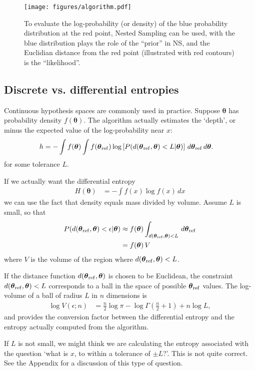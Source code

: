\documentclass[entropy,article,accept,oneauthor,pdftex,10pt,a4paper]{mdpi}
\newcommand{\x}{\boldsymbol{\theta}}
\newcommand{\xref}{\x_{\rm ref}}
\begin{document}
\begin{figure}[!ht]
\centering
\texttt{[image: figures/algorithm.pdf]}
\caption{To evaluate the log-probability (or density) of the blue
probability distribution at the red point, Nested Sampling can be used,
with the blue distribution plays the role of the ``prior'' in NS, and the
Euclidian distance from the red point (illustrated with red contours)
is the ``likelihood''.\label{fig:algorithm}}
\end{figure}

\subsection{Discrete vs. differential entropies}

Continuous hypothesis spaces are commonly used in practice. Suppose
$\x$ has probability density $f(\x)$. The algorithm actually estimates
the `depth', or minus the expected value of the log-probability near $x$:
\begin{align}
h &= -\int f(\x) \int f(\xref)
            \log \left[ P(d(\xref, \x) < L | \x) \right]
                        \, d\xref \, d\x.
\end{align}
for some tolerance $L$.

If we actually want the differential
entropy
\begin{align}
H(\x) &= -\int f(x) \log f(x) \, dx
\end{align}
we can use the fact that density equals mass divided
by volume. Assume $L$ is small, so that
\begin{align}
P(d(\xref, \x) < \epsilon | \x)
    &\approx
    f(\x) \int_{d(\xref, \x) < L} \, d\xref\\
    &= f(\x) \, V
\end{align}
where $V$ is the volume of the region where $d(\xref, \x) < L$.

If the distance function $d(\xref, \x)$ is chosen to be Euclidean,
the constraint $d(\xref, \x) < L$ corresponds to a ball in the space
of possible $\xref$ values.
The log-volume of a ball of radius $L$ in $n$ dimensions is
\begin{align}
\log V(\epsilon; n) &= \frac{n}{2}\log \pi
                        - \log \Gamma\left(\frac{n}{2} + 1\right)
                        + n \log L,
\end{align}
and provides the conversion factor between the differential entropy and
the entropy actually computed from the algorithm.

If $L$ is not small, we might think we are calculating the entropy associated
with the question `what is $x$, to within a tolerance of $\pm L$?'.
This is not quite correct. See the Appendix for a discussion of this
type of question.
\end{document}
